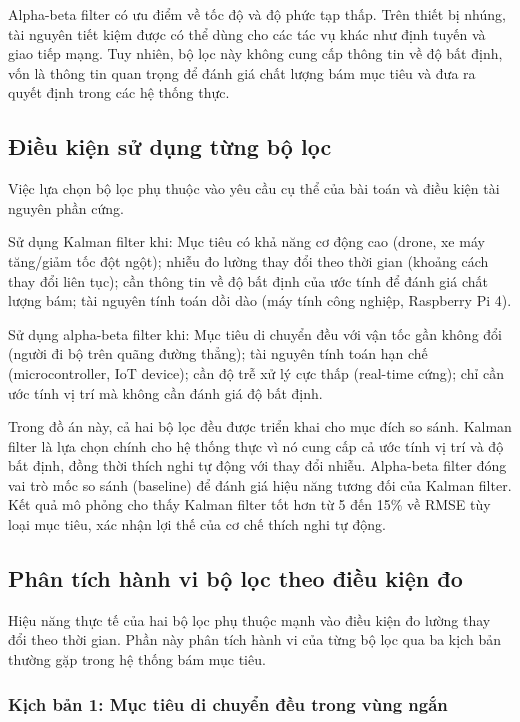 Alpha-beta filter có ưu điểm về tốc độ và độ phức tạp thấp. Trên thiết bị nhúng, tài nguyên tiết kiệm được có thể dùng cho các tác vụ khác như định tuyến và giao tiếp mạng. Tuy nhiên, bộ lọc này không cung cấp thông tin về độ bất định, vốn là thông tin quan trọng để đánh giá chất lượng bám mục tiêu và đưa ra quyết định trong các hệ thống thực.

\subsection{Điều kiện sử dụng từng bộ lọc}

\hspace{0.5cm} Việc lựa chọn bộ lọc phụ thuộc vào yêu cầu cụ thể của bài toán và điều kiện tài nguyên phần cứng.

Sử dụng Kalman filter khi: Mục tiêu có khả năng cơ động cao (drone, xe máy tăng/giảm tốc đột ngột); nhiễu đo lường thay đổi theo thời gian (khoảng cách thay đổi liên tục); cần thông tin về độ bất định của ước tính để đánh giá chất lượng bám; tài nguyên tính toán dồi dào (máy tính công nghiệp, Raspberry Pi 4).

Sử dụng alpha-beta filter khi: Mục tiêu di chuyển đều với vận tốc gần không đổi (người đi bộ trên quãng đường thẳng); tài nguyên tính toán hạn chế (microcontroller, IoT device); cần độ trễ xử lý cực thấp (real-time cứng); chỉ cần ước tính vị trí mà không cần đánh giá độ bất định.

Trong đồ án này, cả hai bộ lọc đều được triển khai cho mục đích so sánh. Kalman filter là lựa chọn chính cho hệ thống thực vì nó cung cấp cả ước tính vị trí và độ bất định, đồng thời thích nghi tự động với thay đổi nhiễu. Alpha-beta filter đóng vai trò mốc so sánh (baseline) để đánh giá hiệu năng tương đối của Kalman filter. Kết quả mô phỏng cho thấy Kalman filter tốt hơn từ 5 đến 15\% về RMSE tùy loại mục tiêu, xác nhận lợi thế của cơ chế thích nghi tự động.

\subsection{Phân tích hành vi bộ lọc theo điều kiện đo}

\hspace{0.5cm} Hiệu năng thực tế của hai bộ lọc phụ thuộc mạnh vào điều kiện đo lường thay đổi theo thời gian. Phần này phân tích hành vi của từng bộ lọc qua ba kịch bản thường gặp trong hệ thống bám mục tiêu.

\subsubsection{Kịch bản 1: Mục tiêu di chuyển đều trong vùng ngắn}

